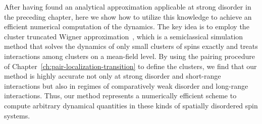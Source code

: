 After having found an analytical approximation applicable at strong disorder in the preceding chapter, here we show how to utilize this knowledge to achieve an efficient numerical computation of the dynamics. The key idea is to employ the cluster truncated Wigner approximation~\cite{wurtzClusterTruncatedWigner2018}, which is a semiclassical simulation method that solves the dynamics of only small clusters of spins exactly and treats interactions among clusters on a mean-field level. By using the pairing procedure of Chapter~\ref{ch:pair-localization-transition} to define the clusters, we find that our method is highly accurate not only at strong disorder and short-range interactions but also in regimes of comparatively weak disorder and long-range interactions. 
Thus, our method represents a numerically efficient scheme to compute arbitrary dynamical quantities in these kinds of spatially disordered spin systems.


